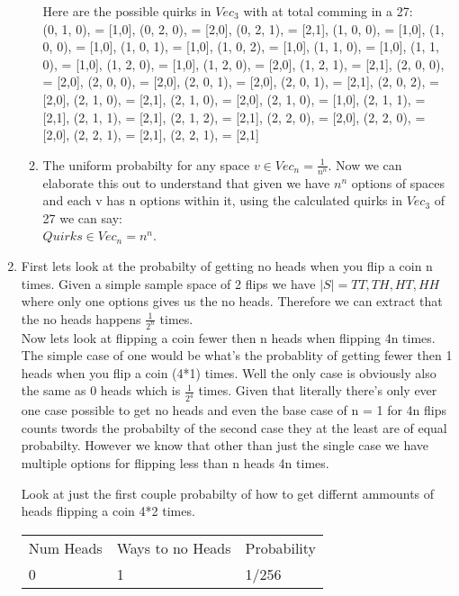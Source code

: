 \documentclass{article}
\begin{document}
\begin{enumerate}
\begin{enumerate}
        \pagebreak

        Here are the possible quirks in $Vec_3$ with at total comming in a 27: \\
        (0, 1, 0), = [1,0], (0, 2, 0), = [2,0], (0, 2, 1), = [2,1], (1, 0, 0), = [1,0],
        (1, 0, 0), = [1,0], (1, 0, 1), = [1,0], (1, 0, 2), = [1,0], (1, 1, 0), = [1,0],
        (1, 1, 0), = [1,0], (1, 2, 0), = [1,0], (1, 2, 0), = [2,0], (1, 2, 1), = [2,1],
        (2, 0, 0), = [2,0], (2, 0, 0), = [2,0], (2, 0, 1), = [2,0], (2, 0, 1), = [2,1],
        (2, 0, 2), = [2,0], (2, 1, 0), = [2,1], (2, 1, 0), = [2,0], (2, 1, 0), = [1,0], 
        (2, 1, 1), = [2,1], (2, 1, 1), = [2,1], (2, 1, 2), = [2,1], (2, 2, 0), = [2,0],
        (2, 2, 0), = [2,0], (2, 2, 1), = [2,1], (2, 2, 1), = [2,1]

        \item The uniform probabilty for any space $v \in Vec_n = \frac{1}{n^n}$.
        Now we can elaborate this out to understand that given we have $n^n$ options of spaces and each v has n options within it, using the calculated quirks in $Vec_3$ of 27 we can say:\\
        $Quirks \in Vec_n = n^n$.        
      \end{enumerate}

      \item First lets look at the probabilty of getting no heads when you flip a coin n times. 
      Given a simple sample space of 2 flips we have $|S| = {TT, TH, HT, HH}$ where only one options gives us the no heads. 
      Therefore we can extract that the no heads happens $\frac{1}{2^n}$ times. \\
      Now lets look at flipping a coin fewer then n heads when flipping 4n times. 
      The simple case of one would be what's the probablity of getting fewer then 1 heads when you flip a coin (4*1) times.
      Well the only case is obviously also the same as 0 heads which is $\frac{1}{2^4}$ times. 
      Given that literally there's only ever one case possible to get no heads and even the base case of n = 1 for 4n flips counts twords the probabilty of the second case they at the least are of equal probabilty.
      However we know that other than just the single case we have multiple options for flipping less than n heads 4n times.

      Look at just the first couple probabilty of how to get differnt ammounts of heads flipping a coin 4*2 times. \\

      \begin{tabular}{lll}
        Num Heads & Ways to no Heads & Probability \\
        0         & 1                 & 1/256       \\
        \end{tabular} \\


\end{enumerate}
\end{document}

